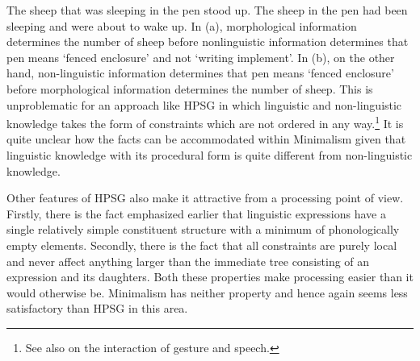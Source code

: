 \documentclass[output=paper
 	        ,biblatex
                ,babelshorthands
                ,newtxmath
                ,draftmode
                ,colorlinks, citecolor=brown
]{langscibook}
\begin{document}
\eal
\label{ex-sheep-pen-processing}
\ex 	The sheep that was sleeping in the pen stood up.
\ex	The sheep in the pen had been sleeping and were about to wake up.
\zl
%
In (a), morphological information determines the number of sheep before nonlinguistic
information determines that pen means ‘fenced enclosure’ and not ‘writing implement’. In (b), on
the other hand, non-linguistic information determines that pen means ‘fenced enclosure’ before
morphological information determines the number of sheep. This is unproblematic for an approach like
HPSG in which linguistic and non-linguistic knowledge takes the form of constraints which are not
ordered in any way.\footnote{%
  See also  on the interaction of gesture and speech.
}
It is quite unclear how the facts can be accommodated within Minimalism given
that linguistic knowledge with its procedural form is quite different from non-linguistic knowledge.

Other features of HPSG also make it attractive from a processing point of view. Firstly, there is
the fact emphasized earlier that linguistic expressions have a single relatively simple constituent
structure with a minimum of phonologically empty elements. Secondly, there is the fact that all
constraints are purely local and never affect anything larger than the immediate tree consisting of an
expression and its daughters. Both these properties make processing easier than it would otherwise
be. Minimalism has neither property and hence again seems less satisfactory than HPSG in this area.
\end{document}
